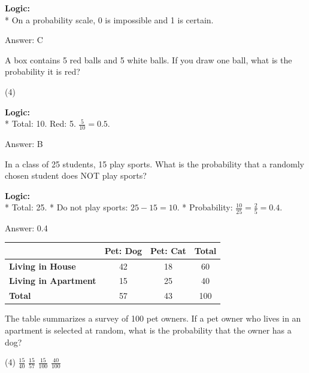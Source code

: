 \documentclass[11pt,paper=a4,answers]{exam}
\begin{document}
\begin{questions}
\begin{solution}
\textbf{Logic:} \\
* On a probability scale, 0 is impossible and 1 is certain.

\vspace{30pt}

Answer: \colorbox{yellow!100}{C}
\end{solution}

\vspace{60pt}

\question
A box contains 5 red balls and 5 white balls. If you draw one ball, what is the probability it is red?
\begin{tasks}(4)
\end{tasks}

\begin{solution}
\textbf{Logic:} \\
* Total: 10. Red: 5. $\frac{5}{10} = 0.5$.

\vspace{30pt}

Answer: \colorbox{yellow!100}{B}
\end{solution}

\vspace{60pt}

\question
In a class of 25 students, 15 play sports. What is the probability that a randomly chosen student does NOT play sports?

\begin{solution}
\textbf{Logic:} \\
* Total: 25.
* Do not play sports: $25 - 15 = 10$.
* Probability: $\frac{10}{25} = \frac{2}{5} = 0.4$.

\vspace{30pt}

Answer: \colorbox{yellow!100}{0.4}
\end{solution}

\question
\begin{center}
\begin{tabular}{|l|c|c|c|}
\hline
 & \textbf{Pet: Dog} & \textbf{Pet: Cat} & \textbf{Total} \\ \hline
\textbf{Living in House} & 42 & 18 & 60 \\ \hline
\textbf{Living in Apartment} & 15 & 25 & 40 \\ \hline
\textbf{Total} & 57 & 43 & 100 \\ \hline
\end{tabular}
\end{center}
The table summarizes a survey of 100 pet owners. If a pet owner who lives in an apartment is selected at random, what is the probability that the owner has a dog?
\begin{tasks}(4)
    \task $\frac{15}{40}$
    \task $\frac{15}{57}$
    \task $\frac{15}{100}$
    \task $\frac{40}{100}$
\end{tasks}


\end{questions}
\end{document}
